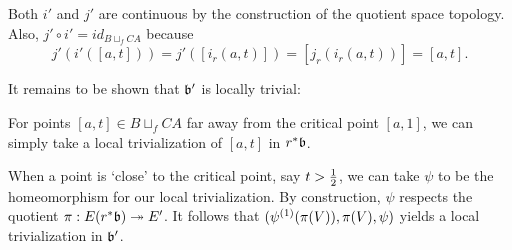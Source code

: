 \begin{myproof}
    Both $i'$ and $j'$ are continuous
    by the construction of the quotient space topology.
    Also, $j' \circ i' = id_{B \sqcup_f CA}$ because
    \[ j'(i'([a, t])) = j'([i_r(a, t)]) = [j_r(i_r(a, t))] = [a, t]. \]
    
    It remains to be shown that $\mathfrak{b}'$ is locally trivial:

    For points $[a, t] \in B \sqcup_f CA $ far away from the critical point $[a, 1]$,
    we can simply take a local trivialization of $[a, t]$ in $r^*\mathfrak{b}$.

    When a point is `close' to the critical point, say $t > \frac{1}{2}$,
    we can take $\psi$ to be the homeomorphism for our local trivialization.
    By construction, $\psi$ respects the quotient $\pi: E(r^*\mathfrak{b}) \twoheadrightarrow{} E'$.
    It follows that $(\psi^{(1)}(\pi(V)), \pi(V), \psi)$
    yields a local trivialization in $\mathfrak{b}'$.
\end{myproof}